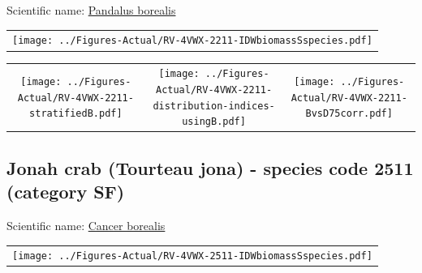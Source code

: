 \documentclass[12pt]{article}\usepackage[]{graphicx}\usepackage[]{color}
\begin{document}

Scientific name: \href{http://www.marinespecies.org/aphia.php?p=taxdetails\&id=107649}{Pandalus borealis} \newline
\begin{minipage}{1.0\textwidth}
 \begin{tabular}{c}
\texttt{[image: ../Figures-Actual/RV-4VWX-2211-IDWbiomassSspecies.pdf]} \\ 
\end{tabular} 
\end{minipage}
\newline

\vspace{1cm}
\begin{minipage}{1.0\textwidth}
 \begin{tabular}{ccc}
\texttt{[image: ../Figures-Actual/RV-4VWX-2211-stratifiedB.pdf]} & 
\texttt{[image: ../Figures-Actual/RV-4VWX-2211-distribution-indices-usingB.pdf]} & 
\texttt{[image: ../Figures-Actual/RV-4VWX-2211-BvsD75corr.pdf]} \\ 
\end{tabular} 
\end{minipage}
\clearpage

\renewcommand\thefigure{\thesubsection\Alph{figure}}

\setcounter{figure}{0}

\hypertarget{sec:2511}{%
\subsection{Jonah crab (Tourteau jona) - species code 2511 (category SF)}\label{sec:2511}}

  


Scientific name: \href{http://www.marinespecies.org/aphia.php?p=taxdetails\&id=158056}{Cancer borealis} \newline
\begin{minipage}{1.0\textwidth}
 \begin{tabular}{c}
\texttt{[image: ../Figures-Actual/RV-4VWX-2511-IDWbiomassSspecies.pdf]} \\ 
\end{tabular} 
\end{minipage}
\newline
\end{document}
